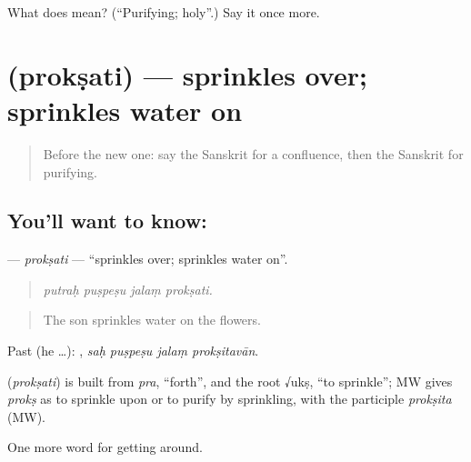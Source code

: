 \begin{tcolorbox}[breakable,colback=teal!4,colframe=teal!35!black,title={Before you move on}]
What does  mean? (\textquotedblleft{}Purifying; holy\textquotedblright{}.) Say it once more.
\end{tcolorbox}
\section[\texorpdfstring{\sk{प्रोक्षति} (prokṣati)}{प्रोक्षति (prokṣati)}]{ (prokṣati) — sprinkles over; sprinkles water on}

\label{lesson:SA-C398-proksati}



\begin{quote}
Before the new one: say the Sanskrit for a confluence, then the Sanskrit for purifying.
\end{quote}

\subsection*{You'll want to know: }
\textbf{} — \emph{prokṣati} — \textquotedblleft{}sprinkles over; sprinkles water on\textquotedblright{}.

\begin{quote}
   
\end{quote}

\begin{quote}
\emph{putraḥ puṣpeṣu jalaṃ prokṣati.}
\end{quote}

\begin{quote}
The son sprinkles water on the flowers.
\end{quote}

Past (he …):    , \emph{saḥ puṣpeṣu jalaṃ prokṣitavān}.

\begin{cousinweb}
\textbf{} (\emph{prokṣati}) is built from \emph{pra}, \textquotedblleft{}forth\textquotedblright{}, and the root √ukṣ, \textquotedblleft{}to sprinkle\textquotedblright{}; MW gives \emph{prokṣ} as to sprinkle upon or to purify by sprinkling, with the participle \emph{prokṣita} (MW).
\end{cousinweb}

\begin{grammarlens}[title={What you've built}]
One more word for getting around.
\end{grammarlens}

